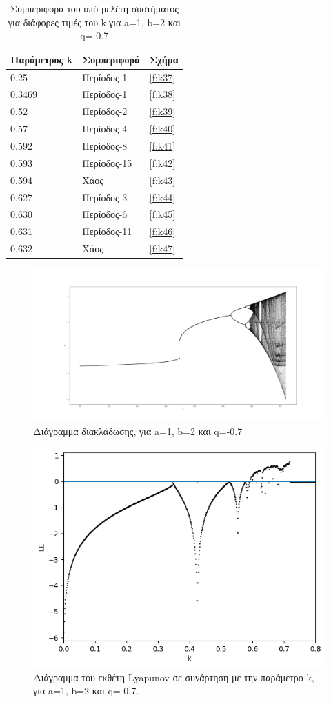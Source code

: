 \begin{table}[h!]
	\centering
	\begin{tabular}{l | l | l}
		Παράμετρος k & Συμπεριφορά & Σχήμα\\
		\hline
		0.25 &  Περίοδος-1 & \ref{f:k37}\\
		0.3469&  Περίοδος-1 & \ref{f:k38}\\
		0.52& Περίοδος-2 & \ref{f:k39}\\
		0.57& Περίοδος-4 & \ref{f:k40}\\
		0.592 &  Περίοδος-8 & \ref{f:k41}\\
		0.593& Περίοδος-15 & \ref{f:k42}\\
		0.594 & Χάος & \ref{f:k43}\\
		0.627 & Περίοδος-3 & \ref{f:k44}\\
		0.630 & Περίοδος-6 & \ref{f:k45}\\
		0.631 & Περίοδος-11 & \ref{f:k46}\\
		0.632 & Χάος & \ref{f:k47}\\
	\end{tabular}
	\caption{ Συμπεριφορά του υπό μελέτη συστήματος για διάφορες τιμές του k,για a=1, b=2 και q=-0.7}
	\label{tab:abc3}
\end{table}

\begin{figure}[h!]
	\centering
	\includegraphics[width=0.6\linewidth]{LateX images/graphs q07/g1}
	\caption{ Διάγραμμα διακλάδωσης, για a=1, b=2 και q=-0.7}
	\label{f:g12}
\end{figure}
\begin{figure}[h!]
	\centering
	\includegraphics[width=0.6\linewidth]{"LateX images/graphs q07/g2 "}
	\caption{Διάγραμμα του εκθέτη Lyapunov σε συνάρτηση με την παράμετρο k, για a=1, b=2 και q=-0.7.}
	\label{f:g13}
\end{figure}

